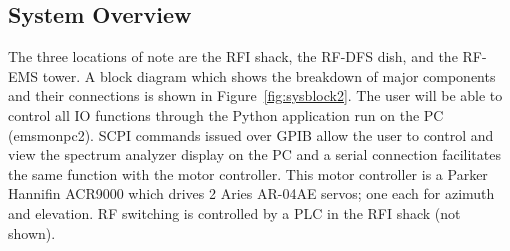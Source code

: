 \documentclass[titlepage]{article}
\begin{document}
\subsection{System Overview}
The three locations of note are the RFI shack, the RF-DFS dish, and the RF-EMS tower. A block diagram which shows the breakdown of major components and their connections is shown in Figure~\ref{fig:sysblock2}. The user will be able to control all IO functions through the Python application run on the PC (emsmonpc2).  SCPI commands issued over GPIB allow the user to control and view the spectrum analyzer display on the PC and a serial connection facilitates the same function with the motor controller. This motor controller is a Parker Hannifin ACR9000 which drives 2 Aries AR-04AE servos; one each for azimuth and elevation. RF switching is controlled by a PLC in the RFI shack (not shown).
\end{document}
